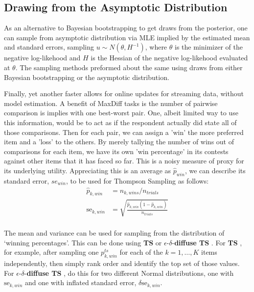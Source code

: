 \documentclass[a4paper,12pt]{article}
\newcommand{\ts}{\textbf{TS} }
\newcommand{\edts}{$\epsilon$-$\delta$-\textbf{diffuse TS} }
\begin{document}
\subsection{Drawing from the Asymptotic Distribution}
As an alternative to Bayesian bootstrapping to get draws from the posterior, one can sample from asymptotic distribution via MLE implied by the estimated mean and standard errors, sampling $u \sim N(\theta,H^{-1})$, where $\theta$ is the minimizer of the negative log-likehood and $H$ is the Hessian of the negative log-likehood evaluated at $\theta$. The sampling methods preformed about the same using draws from either Bayesian bootstrapping or the asymptotic distribution.

Finally, yet another faster allows for online updates for streaming data, without model estimation. A benefit of MaxDiff tasks is the number of pairwise comparison is implies with one best-worst pair. One, albeit limited way to use this information, would be to act as if the respondent actually did state all of those comparisons. Then for each pair, we can assign a 'win' the more preferred item and a 'loss' to the others. By merely tallying the number of wins out of comparisons for each item, we have its own 'win percentage' in its contests against other items that it has faced so far. This is a noisy measure of proxy for its underlying utility. Appreciating this is an average as $\hat{p}_{win}$, we can describe its standard error, $se_{win}$, to be used for Thompson Sampling as follows:
\begin{align}
\hat{p}_{k,win} &= n_{k,wins} / n_{trials} \\
\text{se}_{k,win} &= \sqrt{  \frac{ \hat{p}_{k,win} (1-\hat{p}_{k,win}) } {n_{trials}}  } \\
\end{align}

The mean and variance can be used for sampling from the distribution of `winning percentages'. This can be done using \ts or \edts. For \ts, for example, after sampling one $p_{k,win}^{ts}$ for each of the $k=1,\ldots,K$ items independently, then simply rank order and identify the top set of those values. For \edts, do this for two different Normal distributions, one with $\text{se}_{k,win}$ and one with inflated standard error, $\delta \text{se}_{k,win}$.
\end{document}
